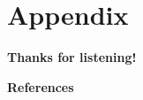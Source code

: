 \documentclass[9pt]{beamer}
\begin{document}
\section{Appendix}


\begin{frame}
    \begin{center}
        \LARGE\bf Thanks for listening!
    \end{center}
\end{frame}



\begin{frame}{\bf References}
    \nocite{*} %
    
    
\end{frame}
\end{document}
